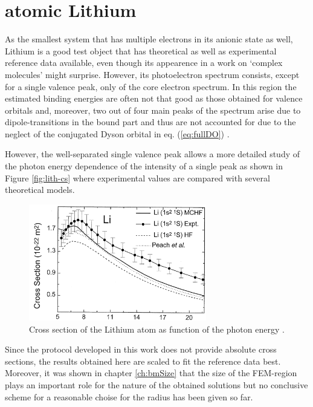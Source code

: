 \section{atomic Lithium}
\label{ch:resLI}
As the smallest system that has multiple electrons in its anionic state as well, Lithium is a good test object that has theoretical as well as experimental reference data available, \cite{Li-R,Li-R1, LiNaRef1} even though its appearence in a work on `complex molecules' might surprise.
However, its photoelectron spectrum consists, except for a single valence peak, only of the core electron spectrum.
In this region the estimated binding energies are often not that good as those obtained for valence orbitals and, moreover, two out of four main peaks of the spectrum arise due to dipole-transitions in the bound part and thus are not accounted for due to the neglect of the conjugated Dyson orbital in eq. (\ref{eq:fullDO}) \cite{saPonzi}.
%

However, the well-separated single valence peak allows a more detailed study of the photon energy dependence of the intensity of a single peak as shown in Figure \ref{fig:lith-cs} where experimental values are compared with several theoretical models.
\begin{figure}
\includegraphics[width=0.69\textwidth]{Figures/Lithium/Li_crossSect}
\caption{Cross section of the Lithium atom as function of the photon energy \cite{LiCS}.}
\label{fig:Lith-cs}
\end{figure}
Since the protocol developed in this work does not provide absolute cross sections, the results obtained here are scaled to fit the reference data best.
Moreover, it was shown in chapter \ref{ch:bmSize} that the size of the FEM-region plays an important role for the nature of the obtained solutions but no conclusive scheme for a reasonable choise for the radius has been given so far.

